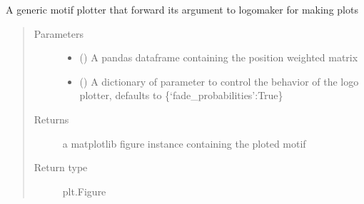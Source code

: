 \documentclass[letterpaper,10pt,english]{sphinxmanual}
\begin{document}
\begin{fulllineitems}
\label{\detokenize{IPTK.Visualization:IPTK.Visualization.vizTools.plot_motif}}
A generic motif plotter that forward its argument to logomaker for making plots
\begin{quote}\begin{description}
\item[{Parameters}] \leavevmode\begin{itemize}
\item {} 
 () \textendash{} A pandas dataframe containing the position weighted matrix

\item {} 
 (\sphinxstyleliteralemphasis{\sphinxupquote{, }}) \textendash{} A dictionary of parameter to control the behavior of the logo plotter, defaults to \{‘fade\_probabilities’:True\}

\end{itemize}

\item[{Returns}] \leavevmode
a matplotlib figure instance containing the ploted motif

\item[{Return type}] \leavevmode
plt.Figure

\end{description}\end{quote}

\end{fulllineitems}

\end{document}
